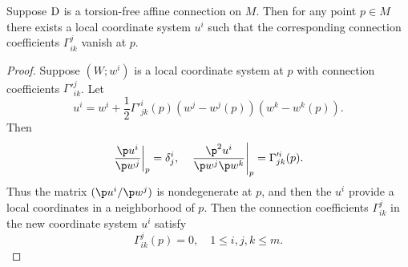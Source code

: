 \documentclass[11pt]{article}
\begin{document}
\begin{theorem}
    Suppose $\text{D}$ is a torsion-free affine connection on $M$. Then for any point $p \in M$ there exists a local coordinate system $u^i$ such that the corresponding connection coefficients $\Gamma^j_{ik}$ vanish at $p$. 
\end{theorem}
\begin{proof}
    Suppose $(W;w^i)$ is a local coordinate system at $p$ with connection coefficients $\Gamma'^j_{ik}$. Let $$u^i = w^i + \frac{1}{2}\Gamma'^i_{jk}(p)(w^j - w^j(p))(w^k - w^k(p)).$$ Then $$\left.\frac{\p u^i}{\p w^j}\right|_p = \delta^i_j, \quad \left.\frac{\p^2 u^i}{\p w^j \p w^k}\right|_p = \Gamma'^i_{jk}(p).$$ Thus the matrix $(\p u^i / \p w^j)$ is nondegenerate at $p$, and then the $u^i$ provide a local coordinates in a neighborhood of $p$. Then the connection coefficients $\Gamma^j_{ik}$ in the new coordinate system $u^i$ satisfy $$\Gamma^j_{ik}(p) = 0, \quad 1 \le i, j, k \le m.$$
\end{proof}
\end{document}
